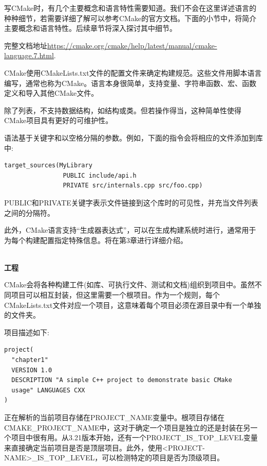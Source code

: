 
写CMake时，有几个主要概念和语言特性需要知道。我们不会在这里详述语言的种种细节，若需要详细了解可以参考CMake的官方文档。下面的小节中，将简介主要概念和语言特性。后续章节将深入探讨其中细节。

完整文档地址\url{https://cmake.org/cmake/help/latest/manual/cmake-language.7.html}.


CMake使用CMakeLists.txt文件的配置文件来确定构建规范。这些文件用脚本语言编写，通常也称为CMake。语言本身很简单，支持变量、字符串函数、宏、函数定义和导入其他CMake文件。

除了列表，不支持数据结构，如结构或类。但若操作得当，这种简单性使得CMake项目具有更好的可维护性。

语法基于关键字和以空格分隔的参数。例如，下面的指令会将相应的文件添加到库中:

\begin{lstlisting}[style=styleCMake]
target_sources(MyLibrary
                PUBLIC include/api.h
                PRIVATE src/internals.cpp src/foo.cpp)
\end{lstlisting}

PUBLIC和PRIVATE关键字表示文件链接到这个库时的可见性，并充当文件列表之间的分隔符。

此外，CMake语言支持“生成器表达式”，可以在生成构建系统时进行，通常用于为每个构建配置指定特殊信息。将在第3章进行详细介绍。

\hspace*{\fill} \\ %
\noindent
\textbf{工程}

CMake会将各种构建工件(如库、可执行文件、测试和文档)组织到项目中。虽然不同项目可以相互封装，但这里需要一个根项目。作为一个规则，每个CMakeLists.txt文件对应一个项目，这意味着每个项目必须在源目录中有一个单独的文件夹。

项目描述如下:

\begin{lstlisting}[style=styleCMake]
project(
  "chapter1"
  VERSION 1.0
  DESCRIPTION "A simple C++ project to demonstrate basic CMake
  usage" LANGUAGES CXX
)
\end{lstlisting}

正在解析的当前项目存储在PROJECT\_NAME变量中。根项目存储在CMAKE\_PROJECT\_NAME中，这对于确定一个项目是独立的还是封装在另一个项目中很有用。从3.21版本开始，还有一个PROJECT\_IS\_TOP\_LEVEL变量来直接确定当前项目是否是顶层项目。此外，使用<PROJECT-NAME>\_IS\_TOP\_LEVEL，可以检测特定的项目是否为顶级项目。

